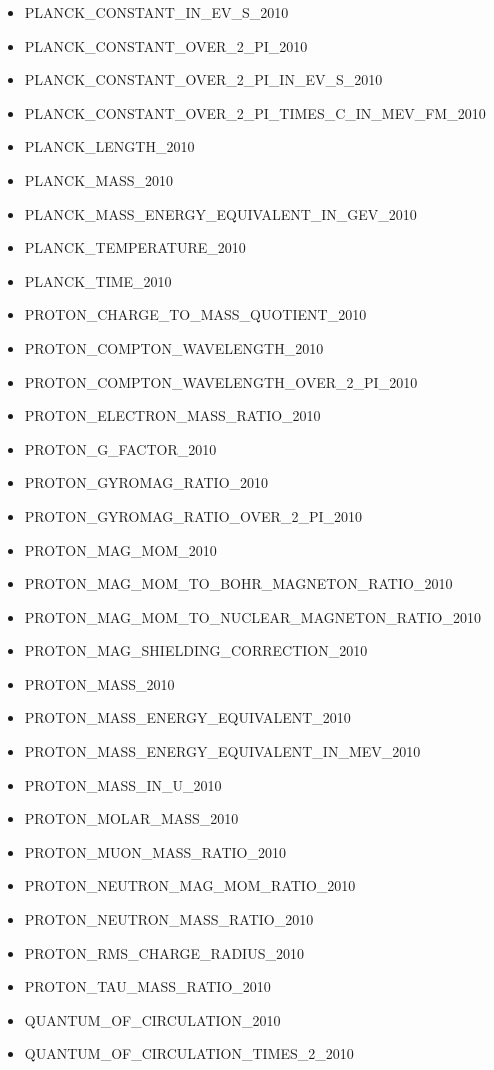 \begin{itemize}
\item PLANCK\_CONSTANT\_IN\_EV\_S\_2010
\item PLANCK\_CONSTANT\_OVER\_2\_PI\_2010
\item PLANCK\_CONSTANT\_OVER\_2\_PI\_IN\_EV\_S\_2010
\item PLANCK\_CONSTANT\_OVER\_2\_PI\_TIMES\_C\_IN\_MEV\_FM\_2010
\item PLANCK\_LENGTH\_2010
\item PLANCK\_MASS\_2010
\item PLANCK\_MASS\_ENERGY\_EQUIVALENT\_IN\_GEV\_2010
\item PLANCK\_TEMPERATURE\_2010
\item PLANCK\_TIME\_2010
\item PROTON\_CHARGE\_TO\_MASS\_QUOTIENT\_2010
\item PROTON\_COMPTON\_WAVELENGTH\_2010
\item PROTON\_COMPTON\_WAVELENGTH\_OVER\_2\_PI\_2010
\item PROTON\_ELECTRON\_MASS\_RATIO\_2010
\item PROTON\_G\_FACTOR\_2010
\item PROTON\_GYROMAG\_RATIO\_2010
\item PROTON\_GYROMAG\_RATIO\_OVER\_2\_PI\_2010
\item PROTON\_MAG\_MOM\_2010
\item PROTON\_MAG\_MOM\_TO\_BOHR\_MAGNETON\_RATIO\_2010
\item PROTON\_MAG\_MOM\_TO\_NUCLEAR\_MAGNETON\_RATIO\_2010
\item PROTON\_MAG\_SHIELDING\_CORRECTION\_2010
\item PROTON\_MASS\_2010
\item PROTON\_MASS\_ENERGY\_EQUIVALENT\_2010
\item PROTON\_MASS\_ENERGY\_EQUIVALENT\_IN\_MEV\_2010
\item PROTON\_MASS\_IN\_U\_2010
\item PROTON\_MOLAR\_MASS\_2010
\item PROTON\_MUON\_MASS\_RATIO\_2010
\item PROTON\_NEUTRON\_MAG\_MOM\_RATIO\_2010
\item PROTON\_NEUTRON\_MASS\_RATIO\_2010
\item PROTON\_RMS\_CHARGE\_RADIUS\_2010
\item PROTON\_TAU\_MASS\_RATIO\_2010
\item QUANTUM\_OF\_CIRCULATION\_2010
\item QUANTUM\_OF\_CIRCULATION\_TIMES\_2\_2010

\end{itemize}
